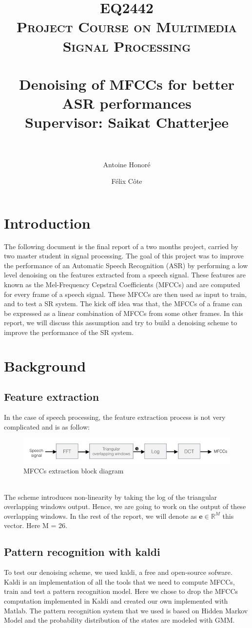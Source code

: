 \documentclass[a4paper]{report}
\title{	 
\textsc{EQ2442\\Project Course on Multimedia Signal Processing}\\[25pt] 
\horrule{1pt} \\[0.4cm] %
\huge {Denoising of MFCCs for better ASR performances} \\[0.4 cm] %
\Large{Supervisor: Saikat Chatterjee}\\[0.4 cm]
\horrule{2pt} \\[0.2cm] %
}
\author{ Antoine Honoré\\ \email{honore@kth.se} \and Félix Côte\\\email{fcote@kth.se} }
\begin{document}
\maketitle
\tableofcontents
\section*{Introduction}
The following document is the final report of a two months project, carried by two master student in signal processing. The goal of this project was to improve the performance of an Automatic Speech Recognition (ASR) by performing a low level denoising on the features extracted from  a speech signal. These features are known as the Mel-Frequency Cepstral Coefficients (MFCCs) and are computed for every frame of a speech signal. These MFCCs are then used as input to train, and to test a SR system. The kick off idea was that, the MFCCs of a frame can be expressed as a linear combination of MFCCs from some other frames. In this report, we will discuss this assumption and try to build a denoising scheme to improve the performance of the SR system.
\section{Background}
\subsection{Feature extraction}
In the case of speech processing, the feature extraction process is not very complicated and is as follow:
\begin{figure}[!ht]
\centering
\includegraphics[scale= .3]{feature_extraction}
\caption{MFCCs extraction block diagram}
\label{feature_extraction}
\end{figure}\\
The scheme introduces non-linearity by taking the log of the triangular overlapping windows output. Hence, we are going to work on the output of these overlapping windows. In the rest of the report, we will denote as $\textbf{e} \in \mathbb{R}^M$ this vector. Here M = 26.

\subsection{Pattern recognition with kaldi}
To test our denoising scheme, we used kaldi, a free and open-source sofware. Kaldi is an implementation of all the tools that we need to compute MFCCs, train and test a pattern recognition model. Here we chose to drop the MFCCs computation implemented in Kaldi and created our own implemented with Matlab. The pattern recognition system that we used is based on Hidden Markov Model and the probability distribution of the states are modeled with GMM.
\end{document}
